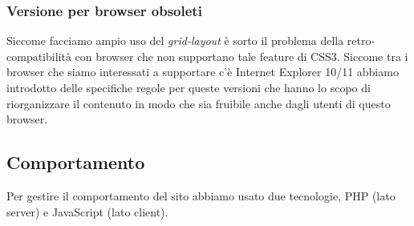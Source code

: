 \documentclass[1_relazione.tex]{subfiles}
\begin{document}
\subsubsection{Versione per browser obsoleti}
Siccome facciamo ampio uso del \textit{grid-layout} è sorto il problema della retro-compatibilità con browser che non supportano tale feature di CSS3. Siccome tra i browser che siamo interessati a supportare c'è Internet Explorer 10/11 abbiamo introdotto delle specifiche regole per queste versioni che hanno lo scopo di riorganizzare il contenuto in modo che sia fruibile anche dagli utenti di questo browser.

\subsection{Comportamento}
Per gestire il comportamento del sito abbiamo usato due tecnologie, PHP (lato server) e JavaScript (lato client).
\end{document}
